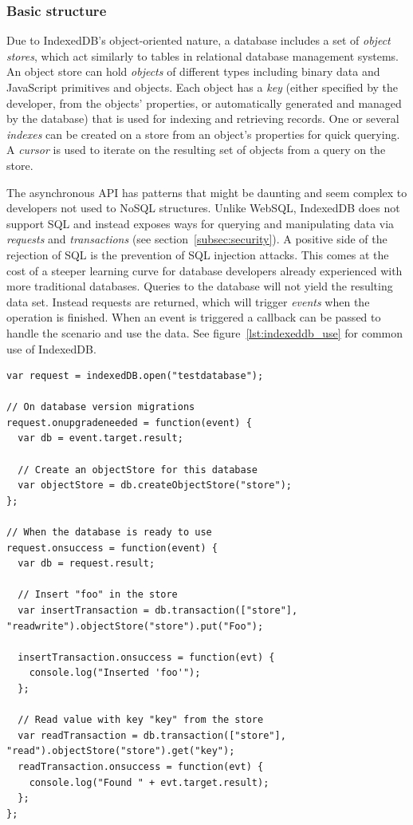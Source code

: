 \subsubsection{Basic structure}
Due to IndexedDB's object-oriented nature, a database includes a set of \emph{object stores}, which act similarly to tables in relational database management systems. An object store can hold \emph{objects} of different types including binary data and JavaScript primitives and objects. Each object has a \emph{key} (either specified by the developer, from the objects' properties, or automatically generated and managed by the database) that is used for indexing and retrieving records. One or several \emph{indexes} can be created on a store from an object's properties for quick querying. A \emph{cursor} is used to iterate on the resulting set of objects from a query on the store.

The asynchronous API has patterns that might be daunting and seem complex to developers not used to NoSQL structures. Unlike WebSQL, IndexedDB does not support SQL and instead exposes ways for querying and manipulating data via \emph{requests} and \emph{transactions} (see section~\ref{subsec:security}). A positive side of the rejection of SQL is the prevention of SQL injection attacks. This comes at the cost of a steeper learning curve for database developers already experienced with more traditional databases. Queries to the database will not yield the resulting data set. Instead requests are returned, which will trigger \emph{events} when the operation is finished. When an event is triggered a callback can be passed to handle the scenario and use the data. See figure~\ref{lst:indexeddb_use} for common use of IndexedDB.

\begin{Code}
\begin{lstlisting}[caption={Use of IndexedDB}, label={lst:indexeddb_use}]
var request = indexedDB.open("testdatabase");

// On database version migrations
request.onupgradeneeded = function(event) {
  var db = event.target.result;

  // Create an objectStore for this database
  var objectStore = db.createObjectStore("store");
};

// When the database is ready to use
request.onsuccess = function(event) {
  var db = request.result;

  // Insert "foo" in the store
  var insertTransaction = db.transaction(["store"], "readwrite").objectStore("store").put("Foo");

  insertTransaction.onsuccess = function(evt) {
    console.log("Inserted 'foo'");
  };

  // Read value with key "key" from the store
  var readTransaction = db.transaction(["store"], "read").objectStore("store").get("key");
  readTransaction.onsuccess = function(evt) {
    console.log("Found " + evt.target.result);
  };
};
\end{lstlisting}
\end{Code}

